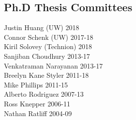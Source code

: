 \subsection{Ph.D Thesis Committees}
\noindent
Justin Huang (UW) \hfill 2018\\
Connor Schenk (UW) \hfill 2017-18\\
Kiril Solovey (Technion) \hfill 2018\\
Sanjiban Choudhury \hfill 2013-17\\
Venkatraman Narayanan \hfill 2013-17\\
Breelyn Kane Styler  \hfill 2011-18\\ 
Mike Phillips  \hfill 2011-15\\
Alberto Rodriguez  \hfill 2007-13\\
Ross Knepper  \hfill 2006-11\\
Nathan Ratliff  \hfill 2004-09\\
